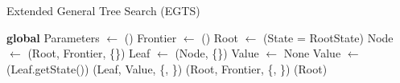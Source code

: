 \begin{algorithm}[H]
    \caption{Extended General Tree Search (EGTS)}
    \label{alg:general_tree_search_2}
    \begin{algorithmic}[1]
    
        \State \textbf{global} Parameters $\leftarrow$ ()
        \State Frontier $\leftarrow$ ()
        \State Root $\leftarrow$ (State = RootState)
            \State Node $\leftarrow$ \select(Root, Frontier, \{\})
            \State Leaf $\leftarrow$ \expand(Node, \{\})
            \State Value $\leftarrow$ None
                \State Value $\leftarrow$ \eval(Leaf.getState())
            \EndIf
                \State \bp(Leaf, Value, \{, \})
            \EndIf
                \State \trim(Root, Frontier, \{, \})
            \EndIf
        \EndWhile
        \State \Return \gbm(Root)
    \EndProcedure
    \end{algorithmic}
\end{algorithm}